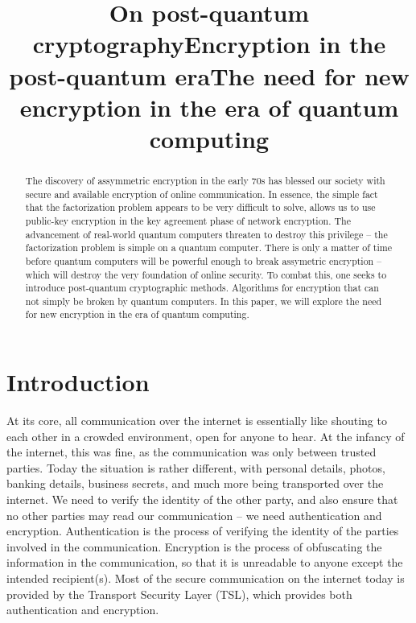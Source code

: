 \documentclass[conference]{IEEEtran}
\begin{document}
\title{On post-quantum cryptography}
\title{Encryption in the post-quantum era}
\title{The need for new encryption in the era of quantum computing}

\author{}

\maketitle

\begin{abstract}
  The discovery of assymmetric encryption in the early 70s has blessed our society with secure and available encryption of online communication.
  In essence, the simple fact that the factorization problem appears to be very difficult to solve, allows us to use public-key encryption in the key agreement phase of network encryption.
  The advancement of real-world quantum computers threaten to destroy this privilege -- the factorization problem is simple on a quantum computer.
  There is only a matter of time before quantum computers will be powerful enough to break assymetric encryption -- which will destroy the very foundation of online security.
  To combat this, one seeks to introduce post-quantum cryptographic methods.
  Algorithms for encryption that can not simply be broken by quantum computers.
  In this paper, we will explore the need for new encryption in the era of quantum computing.
\end{abstract}


\section{Introduction}
At its core, all communication over the internet is essentially like shouting to each other in a crowded environment, open for anyone to hear.
At the infancy of the internet, this was fine, as the communication was only between trusted parties.
Today the situation is rather different, with personal details, photos, banking details, business secrets, and much more being transported over the internet.
We need to verify the identity of the other party, and also ensure that no other parties may read our communication -- we need authentication and encryption.
Authentication is the process of verifying the identity of the parties involved in the communication.
Encryption is the process of obfuscating the information in the communication, so that it is unreadable to anyone except the intended recipient(s).
Most of the secure communication on the internet today is provided by the Transport Security Layer (TSL)\cite{sslpulse.2020}, which provides both authentication and encryption.
\end{document}
